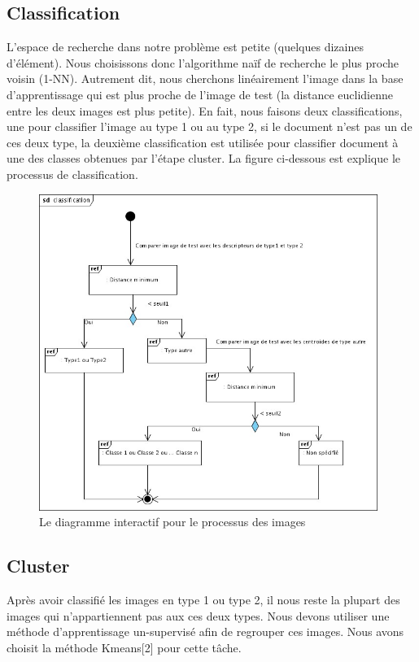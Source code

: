 \documentclass[french,12pt,a4paper,oneside,notitlepage]{report}
\begin{document}
\subsection{Classification}
L'espace de recherche dans notre problème est petite (quelques dizaines d'élément). Nous 
choisissons donc l'algorithme naïf de recherche le plus proche voisin (1-NN). Autrement 
dit, nous cherchons linéairement l'image dans la base d'apprentissage qui est plus proche 
de l'image de test (la distance euclidienne entre les deux images est plus petite). En 
fait, nous faisons deux classifications, une pour classifier l'image au type 1 ou au type 
2, si le document n'est pas un de ces deux type, la deuxième classification est utilisée 
pour classifier document à une des classes obtenues par l'étape cluster. La figure 
ci-dessous est explique le processus de classification.
\begin{figure}[ht]
	\begin{center}
	  \includegraphics[width=11cm]{classification.jpg}
	\end{center}
	 \caption{Le diagramme interactif pour le processus des images}
\end{figure}

\subsection{Cluster}
Après avoir classifié les images en type 1 ou type 2, il nous reste la plupart des images 
qui n'appartiennent pas aux ces deux types. Nous devons utiliser une méthode 
d'apprentissage un-supervisé afin de regrouper ces images. Nous avons choisit la méthode 
Kmeans[2] pour cette tâche. 
\end{document}
